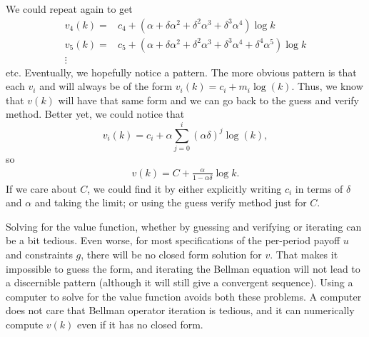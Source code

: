 \begin{example}
  We could repeat again to get 
  \begin{align*}
    v_4(k) = & c_4 + (\alpha + \delta \alpha^2 + \delta^2 \alpha^3 +
    \delta^3 \alpha^4) \log k \\
    v_5(k) = & c_5 + (\alpha + \delta \alpha^2 + \delta^2 \alpha^3 +
    \delta^3 \alpha^4 + \delta^4 \alpha^5) \log k \\
    \vdots
  \end{align*}
  etc. Eventually, we hopefully notice a pattern. The more obvious
  pattern is that each $v_i$ and will always be of the form $v_i(k) =
  c_i + m_i \log(k)$. Thus, we know that $v(k)$ will have that same
  form and we can go back to the guess and verify method. Better yet,
  we could notice that
  \[ v_i(k) = c_i + \alpha \sum_{j = 0}^i (\alpha \delta)^j \log(k),\]
  so 
  \begin{align*}
    v(k) = C + \frac{\alpha}{1-\alpha \delta} \log k.
  \end{align*}
  If we care about $C$, we could find it by either explicitly writing
  $c_i$ in terms of $\delta$ and $\alpha$ and taking the limit; or
  using the guess verify method just for $C$. 
\end{example}

Solving for the value function, whether by guessing and verifying or
iterating can be a bit tedious. Even worse, for most specifications of
the per-period payoff $u$ and constraints $g$, there will be no closed
form solution for $v$. That makes it impossible to guess the form, and
iterating the Bellman equation will not lead to a discernible pattern
(although it will still give a convergent sequence). Using a computer to
solve for the value function avoids both these problems. A computer
does not care that Bellman operator iteration is tedious, and it can
numerically compute $v(k)$ even if it has no closed form. 

